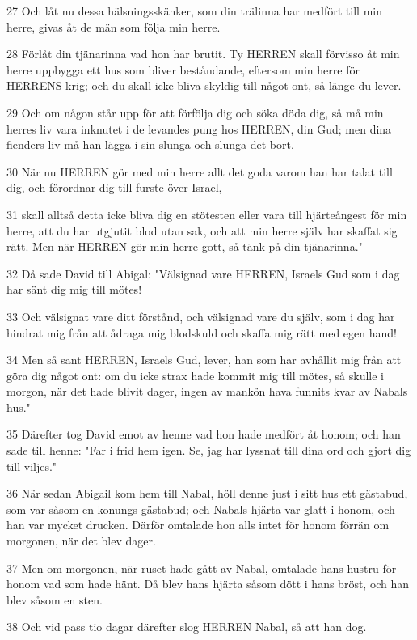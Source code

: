 \par 27 Och låt nu dessa hälsningsskänker, som din trälinna har medfört till min herre, givas åt de män som följa min herre.
\par 28 Förlåt din tjänarinna vad hon har brutit. Ty HERREN skall förvisso åt min herre uppbygga ett hus som bliver beståndande, eftersom min herre för HERRENS krig; och du skall icke bliva skyldig till något ont, så länge du lever.
\par 29 Och om någon står upp för att förfölja dig och söka döda dig, så må min herres liv vara inknutet i de levandes pung hos HERREN, din Gud; men dina fienders liv må han lägga i sin slunga och slunga det bort.
\par 30 När nu HERREN gör med min herre allt det goda varom han har talat till dig, och förordnar dig till furste över Israel,
\par 31 skall alltså detta icke bliva dig en stötesten eller vara till hjärteångest för min herre, att du har utgjutit blod utan sak, och att min herre själv har skaffat sig rätt. Men när HERREN gör min herre gott, så tänk på din tjänarinna."
\par 32 Då sade David till Abigal: "Välsignad vare HERREN, Israels Gud som i dag har sänt dig mig till mötes!
\par 33 Och välsignat vare ditt förstånd, och välsignad vare du själv, som i dag har hindrat mig från att ådraga mig blodskuld och skaffa mig rätt med egen hand!
\par 34 Men så sant HERREN, Israels Gud, lever, han som har avhållit mig från att göra dig något ont: om du icke strax hade kommit mig till mötes, så skulle i morgon, när det hade blivit dager, ingen av mankön hava funnits kvar av Nabals hus."
\par 35 Därefter tog David emot av henne vad hon hade medfört åt honom; och han sade till henne: "Far i frid hem igen. Se, jag har lyssnat till dina ord och gjort dig till viljes."
\par 36 När sedan Abigail kom hem till Nabal, höll denne just i sitt hus ett gästabud, som var såsom en konungs gästabud; och Nabals hjärta var glatt i honom, och han var mycket drucken. Därför omtalade hon alls intet för honom förrän om morgonen, när det blev dager.
\par 37 Men om morgonen, när ruset hade gått av Nabal, omtalade hans hustru för honom vad som hade hänt. Då blev hans hjärta såsom dött i hans bröst, och han blev såsom en sten.
\par 38 Och vid pass tio dagar därefter slog HERREN Nabal, så att han dog.
